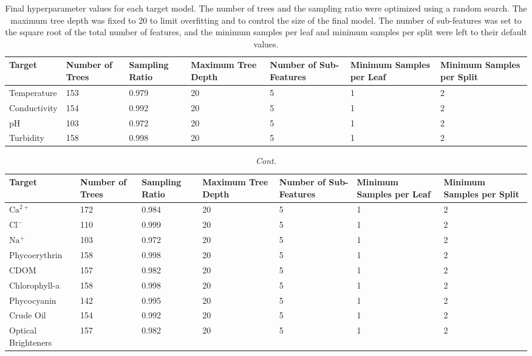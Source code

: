 \documentclass[remotesensing,article,accept,pdftex,moreauthors]{Definitions/mdpi}
\begin{document}
\vspace{-6pt}
\begin{table}[H] 
\caption{Final hyperparameter values for each target model. The number of trees and the sampling ratio were optimized using a random search. The maximum tree depth was fixed to 20 to limit overfitting and to control the size of the final model. The number of sub-features was set to the square root of the total number of features, and the minimum samples per leaf and minimum samples per split were left to their default values. \label{tab:hyperparameters}}
\begin{tabularx}{\textwidth}{CCCCCCC}
\toprule
\textbf{Target}	& \textbf{Number of Trees}	& \textbf{Sampling Ratio} & \textbf{Maximum Tree Depth} & \textbf{Number of Sub-Features} & \textbf{Minimum Samples per Leaf} & \textbf{Minimum Samples per Split}\\
\midrule
Temperature & 153 & 0.979 & 20 & 5 & 1 & 2 \\
Conductivity & 154 & 0.992 & 20 & 5 & 1 & 2\\
pH & 103 & 0.972 & 20 & 5 & 1 & 2\\
Turbidity & 158 & 0.998 & 20 & 5 & 1 & 2\\

\bottomrule
\end{tabularx}
\end{table}

\begin{table}[H]\ContinuedFloat
\small
\caption{\textit{Cont.}}

\begin{tabularx}{\textwidth}{CCCCCCC}
\toprule
\textbf{Target}	& \textbf{Number of Trees}	& \textbf{Sampling Ratio} & \textbf{Maximum Tree Depth} & \textbf{Number of Sub-Features} & \textbf{Minimum Samples per Leaf} & \textbf{Minimum Samples per Split}\\
\midrule
$\mathrm{Ca}^{2+}$ & 172 & 0.984 & 20 & 5 & 1 & 2\\
$\mathrm{Cl^-}$ & 110 & 0.999 & 20 & 5 & 1 & 2\\
$\mathrm{Na^+}$ & 103 & 0.972 & 20 & 5 & 1 & 2\\
Phycoerythrin & 158 & 0.998 & 20 & 5 & 1 & 2\\
CDOM & 157 & 0.982 & 20 & 5 & 1 & 2\\
Chlorophyll-a & 158 & 0.998 & 20 & 5 & 1 & 2\\
Phycocyanin & 142 & 0.995 & 20 & 5 & 1 & 2\\
Crude Oil & 154 & 0.992 & 20 & 5 & 1 & 2\\
Optical Brighteners & 157 & 0.982 & 20 & 5 & 1 & 2\\
\bottomrule
\end{tabularx}
\end{table}
\end{document}
